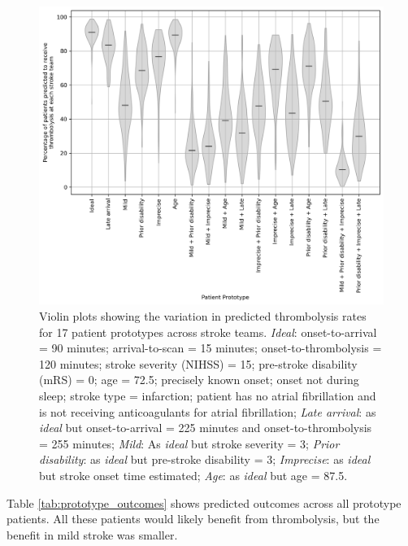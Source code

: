 \begin{figure}
    \centering
    \includegraphics[width=0.75\linewidth]{images/p5_prototype_decision.png}
    \caption{Violin plots showing the variation in predicted thrombolysis rates for 17 patient prototypes across stroke teams. \textit{Ideal}: onset-to-arrival = 90 minutes; arrival-to-scan = 15 minutes; onset-to-thrombolysis = 120 minutes; stroke severity (NIHSS) = 15; pre-stroke disability (mRS) = 0; age = 72.5; precisely known onset; onset not during sleep; stroke type = infarction; patient has no atrial fibrillation and is not receiving anticoagulants for atrial fibrillation; \textit{Late arrival}: as \textit{ideal} but onset-to-arrival = 225 minutes and onset-to-thrombolysis = 255 minutes; \textit{Mild}: As \textit{ideal} but stroke severity = 3; \textit{Prior disability}: as \textit{ideal} but pre-stroke disability = 3; \textit{Imprecise}: as \textit{ideal} but stroke onset time estimated; \textit{Age}: as \textit{ideal} but age = 87.5.}
    \label{fig:thrombolysis_rates_prototype_patients}
\end{figure}

Table \ref{tab:prototype_outcomes} shows predicted outcomes across all prototype patients. All these patients would likely benefit from thrombolysis, but the benefit in mild stroke was smaller.

